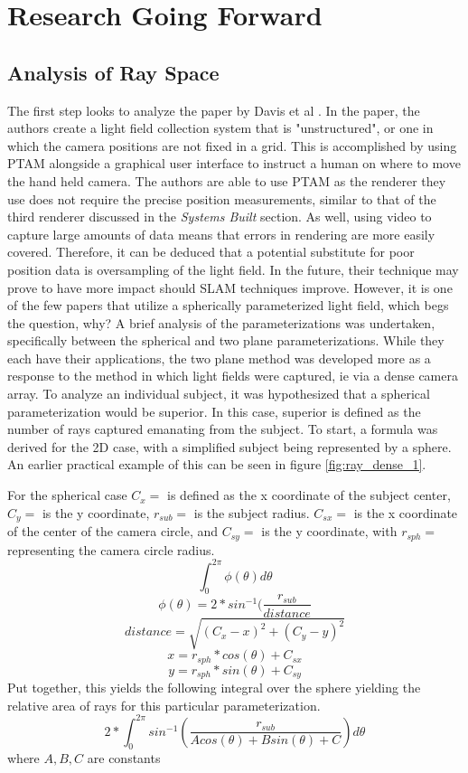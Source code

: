 \documentclass[12pt]{report}
\begin{document}
\chapter{Research Going Forward}
\section{Analysis of Ray Space}
The first step looks to analyze the paper by Davis et al \cite{Davis12}. In the paper, the authors create a light field collection system that is "unstructured", or one in which the camera positions are not fixed in a grid. This is accomplished by using PTAM alongside a graphical user interface to instruct a human on where to move the hand held camera. The authors are able to use PTAM as the renderer they use does not require the precise position measurements, similar to that of the third renderer discussed in the \emph{Systems Built} section. As well, using video to capture large amounts of data means that errors in rendering are more easily covered. Therefore, it can be deduced that a potential substitute for poor position data is oversampling of the light field. In the future, their technique may prove to have more impact should SLAM techniques improve. However, it is one of the few papers that utilize a spherically parameterized light field, which begs the question, why? A brief analysis of the parameterizations was undertaken, specifically between the spherical and two plane parameterizations. While they each have their applications, the two plane method was developed more as a response to the method in which light fields were captured, ie via a dense camera array. To analyze an individual subject, it was hypothesized that a spherical parameterization would be superior. In this case, superior is defined as the number of rays captured emanating from the subject. To start, a formula was derived for the 2D case, with a simplified subject being represented by a sphere. An earlier practical example of this can be seen in figure \ref{fig:ray_dense_1}.

For the spherical case $C_x =$ is defined as the x coordinate of the subject center, $C_y =$ is the y coordinate, $r_{sub} =$ is the subject radius. $C_{sx} =$ is the x coordinate of the center of the camera circle, and $C_{sy} =$ is the y coordinate, with $r_{sph} =$ representing the camera circle radius.
$$\int_{0}^{2\pi} \phi(\theta) d\theta$$
$$\phi(\theta)=2*sin^{-1}(\frac{r_{sub}}{distance}$$
$$distance=\sqrt{(C_x-x)^2+(C_y-y)^2}$$
$$x = r_{sph}*cos(\theta) + C_{sx}$$
$$y=r_{sph}*sin(\theta)+C_{sy}$$
Put together, this yields the following integral over the sphere yielding the relative area of rays for this particular parameterization.
$$2*\int_{0}^{2\pi} sin^{-1}(\frac{r_{sub}}{Acos(\theta)+Bsin(\theta)+C}) d\theta$$
where $A, B, C$ are constants
\end{document}
